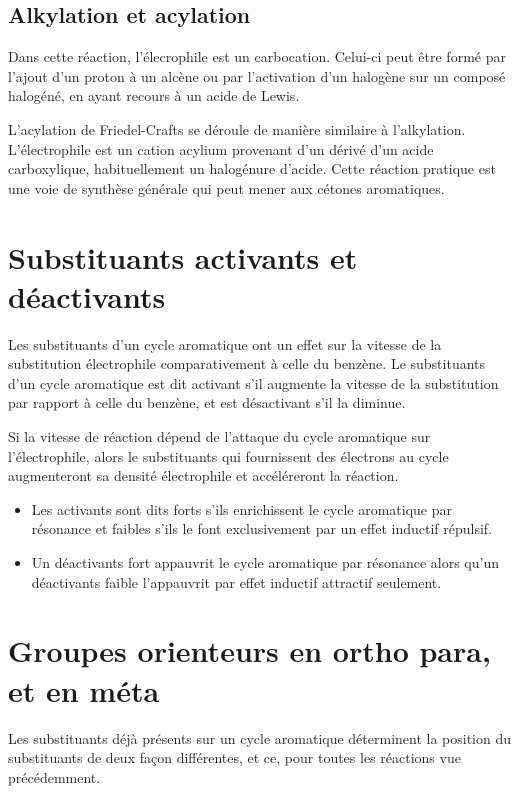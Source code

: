 \subsection{Alkylation et acylation}
Dans cette réaction, l'élecrophile est un carbocation.
Celui-ci peut être formé par l'ajout d'un proton à un alcène ou par l'activation d'un halogène sur un composé halogéné, en ayant recours à un acide de Lewis.

L'acylation de Friedel-Crafts se déroule de manière similaire à l'alkylation.
L'électrophile est un cation acylium provenant d'un dérivé d'un acide carboxylique, habituellement un halogénure d'acide.
Cette réaction pratique est une voie de synthèse générale qui peut mener aux cétones aromatiques.

\section{Substituants activants et déactivants}

Les substituants d'un cycle aromatique ont un effet sur la vitesse de la substitution électrophile comparativement à celle du benzène.
Le substituants d'un cycle aromatique est dit activant s'il augmente la vitesse de la substitution par rapport à celle du benzène, et est désactivant s'il la diminue.

Si la vitesse de réaction dépend de l'attaque du cycle aromatique sur l'électrophile, alors le substituants qui fournissent des électrons au cycle augmenteront sa densité électrophile et accéléreront la réaction.
\begin{itemize}
  \item Les activants sont dits forts s'ils enrichissent le cycle aromatique par résonance et faibles s'ils le font exclusivement par un effet inductif répulsif.
  \item Un déactivants fort appauvrit le cycle aromatique par résonance alors qu'un déactivants faible l'appauvrit par effet inductif attractif seulement.
\end{itemize}



\section{Groupes orienteurs en ortho para, et en méta}

Les substituants déjà présents sur un cycle aromatique déterminent la position du substituants de deux façon différentes, et ce, pour toutes les réactions vue précédemment.


